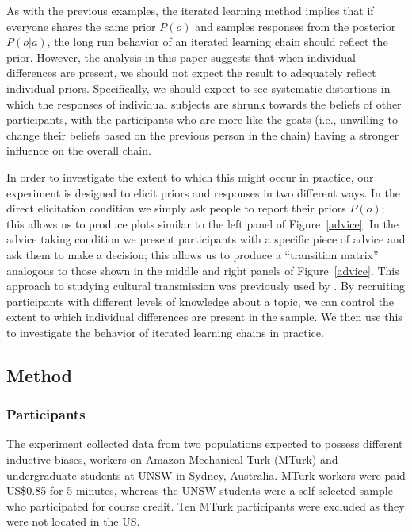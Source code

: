 \documentclass[doc]{apa6}
\begin{document}
As with the previous examples, the iterated learning method implies that if everyone shares the same prior $P(o)$ and samples responses from the posterior $P(o|a)$, the long run behavior of an iterated learning chain should reflect the prior. %
However, the analysis in this paper suggests that when individual differences are present, we should not expect the result to adequately reflect individual priors. Specifically, we should expect to see systematic distortions in which the responses of individual subjects are shrunk towards the beliefs of other participants, with the participants who are more like the {\sc goats} (i.e., unwilling to change their beliefs based on the previous person in the chain) having a stronger influence on the overall chain. 

In order to investigate the extent to which this might occur in practice, our experiment is designed to elicit priors and responses in two different ways. In the {\sc direct elicitation} condition we simply ask people to report their priors $P(o)$; this allows us to produce plots similar to the left panel of Figure~\ref{advice}. In the {\sc advice taking} condition we present participants with a specific piece of advice and ask them to make a decision; this allows us to produce a ``transition matrix'' analogous to those shown in the middle and right panels of Figure~\ref{advice}. This approach to studying cultural transmission was previously used by \textcite{ferdinandetal13}. By recruiting participants with different levels of knowledge about a topic, we can control the extent to which individual differences are present in the sample. We then use this to investigate the behavior of iterated learning chains in practice.

\subsection{Method}

\subsubsection{Participants}

The experiment collected data from two populations expected to possess different inductive biases, workers on Amazon Mechanical Turk (MTurk) and undergraduate students at UNSW in Sydney, Australia. MTurk workers were paid US\$0.85 for 5 minutes, whereas the UNSW students were a self-selected sample who participated for course credit. Ten MTurk participants were excluded as they were not located in the US. 
\end{document}

